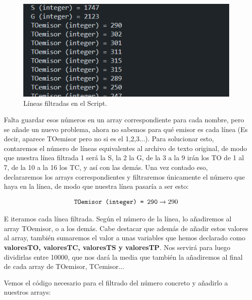 \documentclass{article}
\begin{document}
\quad

\begin{figure}[h]
    \centering
    \includegraphics[width=0.7\linewidth]{src/lineas filtradas1.png}
    \caption{\label{fig:filtradas1} Líneas filtradas en el Script.}
\end{figure}

Falta guardar esos números en un array correspondiente para cada nombre, pero se añade un nuevo problema, ahora no sabemos para qué emisor es cada línea (Es decir, aparece TOemisor pero no si es el 1,2,3...). Para solucionar esto, contaremos el número de líneas equivalentes al archivo de texto original, de modo que nuestra línea filtrada 1 será la S, la 2 la G, de la 3 a la 9 irán los TO de 1 al 7, de la 10 a la 16 los TC, y así con las demás. Una vez contado eso, declararemos los arrays correspondientes y filtraremos únicamente el número que haya en la línea, de modo que nuestra línea pasaría a ser esto:

$$\verb|TOemisor (integer) = 290| \rightarrow 290$$

E iteramos cada línea filtrada. Según el número de la línea, lo añadiremos al array TOemisor, o a los demás. Cabe destacar que además de añadir estos valores al array, también sumaremos el valor a unas variables que hemos declarado como \textbf{valoresTO, valoresTC, valoresTS y valoresTP}. Nos servirá para luego dividirlas entre 10000, que nos dará la media que también la añadiremos al final de cada array de TOemisor, TCemisor... 

Vemos el código necesario para el filtrado del número concreto y añadirlo a nuestros arrays:

\quad 
\end{document}
